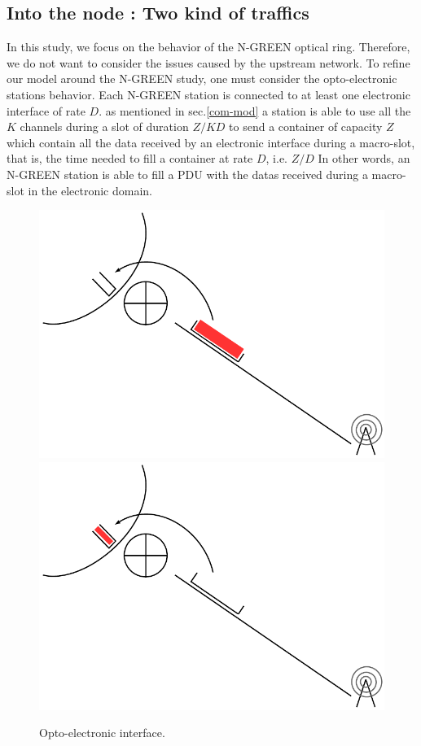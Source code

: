 \documentclass[]{algotel}
\begin{document}
\subsection{Into the node : Two kind of traffics}
  In this study, we focus on the behavior of the N-GREEN optical ring. Therefore, we do not want to consider the issues caused by the upstream network. 
   To refine our model around the N-GREEN study, one must consider the opto-electronic stations behavior.
   Each N-GREEN station is connected to at least one electronic interface of rate $D$. as mentioned in sec.\ref{com-mod} a station is able to use all the $K$ channels during a slot of duration $Z/KD$ to send a container of capacity $Z$ which contain all the data received  by an electronic interface during a macro-slot, that is, the time needed to fill a container at rate $D$, i.e. $Z/D$
  In other words, an N-GREEN station is able to fill a PDU with the datas received during a macro-slot in the electronic domain. 
    
\begin{figure}[h!]
\begin{center}   

      \includegraphics[scale=0.3]{slot1.pdf}
  \includegraphics[scale=0.3]{slot2.pdf}
     \caption{Opto-electronic interface.}
     
\end{center}
  \end{figure}
  
\end{document}
